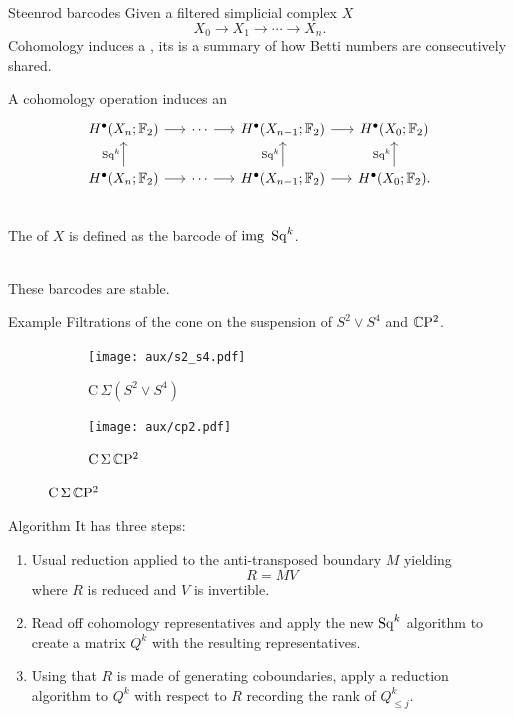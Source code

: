 \begin{frame}[fragile]{Steenrod barcodes}
	Given a filtered simplicial complex $X$
	\[
	X_0 \to X_1 \to \cdots \to X_n.
	\]
	Cohomology induces a , its  is a summary of how Betti numbers are consecutively shared.

	\smallskip
	A cohomology operation induces an 
	\[
	\begin{tikzcd}[column sep = 15]
	H^\bullet(X_n; \Ftwo) \arrow[r] & \cdots \arrow[r] & H^\bullet(X_{n-1}; \Ftwo) \arrow[r] & H^\bullet(X_0; \Ftwo) \\
	H^\bullet(X_n; \Ftwo) \arrow[u, "\Sq^k"] \arrow[r] & \cdots \arrow[r] & H^\bullet(X_{n-1}; \Ftwo) \arrow[u, "\Sq^k"] \arrow[r] & H^\bullet(X_0; \Ftwo) \arrow[u, "\Sq^k"].
	\end{tikzcd}
	\]

	\pause
	 \\
	The  of $X$ is defined as the barcode of $\mathrm{img}\ \Sq^k$.

	\pause\medskip
	 \\
	These barcodes are stable.
\end{frame}

\begin{frame}{Example} \pause
	Filtrations of the cone on the suspension of $S^2 \vee S^4$ and $\mathbb{C} \mathrm{P}^2$.

	\pause
	\begin{figure}
		\centering
		\begin{subfigure}[b]{0.49\textwidth}
			\centering
			\texttt{[image: aux/s2\_s4.pdf]}
			\caption{$\mathrm C\,\Sigma(S^2 \vee S^4)$}
			\label{f:s2_s4}
		\end{subfigure}
		\begin{subfigure}[b]{0.49\textwidth}
			\centering
			\texttt{[image: aux/cp2.pdf]}
			\caption{$\mathrm C\,\Sigma\,\mathbb{C}\mathrm{P}^2$}
			\label{f:cp2}
		\end{subfigure}
	\end{figure}
\end{frame}

\begin{frame}{Algorithm}
	\pause
	It has three steps:

	\begin{enumerate}
		\pause\bigskip
		\item Usual reduction applied to the anti-transposed boundary $M$ yielding
		\[
		R = M V
		\]
		where $R$ is reduced and $V$ is invertible.

		\pause\bigskip
		\item Read off cohomology representatives and apply the new $\operatorname{Sq}^k$ algorithm to create a matrix $Q^k$ with the resulting representatives.

		\pause\bigskip
		\item Using that $R$ is made of generating coboundaries, apply a reduction algorithm to $Q^k$ with respect to $R$ recording the rank of $Q_{\leq j}^k$.
	\end{enumerate}
\end{frame}

